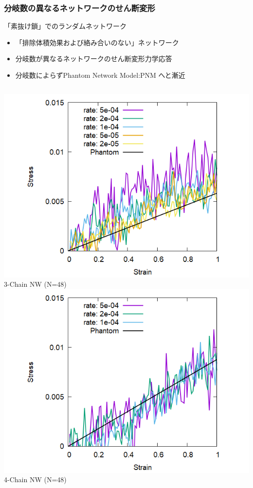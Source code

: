 \documentclass[12pt, dvipdfmx]{beamer}
\begin{document}
\begin{frame}
	\frametitle{分岐数の異なるネットワークのせん断変形}
	\begin{alertblock}{「素抜け鎖」でのランダムネットワーク}
		\begin{itemize}
			\item \alert{「排除体積効果および絡み合いのない」}ネットワーク
		\end{itemize}
	\end{alertblock}
	\begin{itemize}
        \item 分岐数が異なるネットワークのせん断変形力学応答
		\item 分岐数によらずPhantom Network Model:PNM へと漸近
	\end{itemize}

	\begin{columns}[T, onlytextwidth]
			\centering
			\includegraphics[width=\textwidth]{Shear_Random_3chain_N48.png}
			3-Chain NW (N=48)
			\centering
			\includegraphics[width=\textwidth]{Shear_Random_4chain_N48.png}
			4-Chain NW (N=48)
		

\end{columns}
\end{frame}
\end{document}
